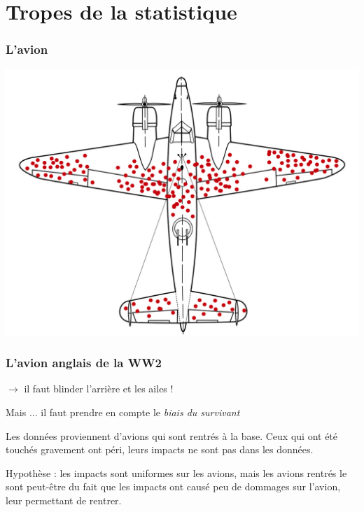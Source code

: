 \documentclass{beamer}
\begin{document}
\section{Tropes de la statistique}


\begin{frame}
\frametitle{L'avion}

\centering
\includegraphics[width=\textwidth,keepaspectratio]{img/plane.png}





\end{frame}




\begin{frame}
\frametitle{L'avion anglais de la WW2}



$\rightarrow$ il faut blinder l'arrière et les ailes ! 

Mais ... 
\pause
il faut prendre en compte le \emph{\alert{biais du survivant} }

\pause

Les données proviennent d'avions qui sont \alert{rentrés} à la base.  
Ceux qui ont été touchés gravement ont péri, leurs impacts ne sont \alert{pas} dans les données.

Hypothèse :  les impacts sont uniformes sur les avions, \alert{mais} les avions rentrés le sont peut-être du fait que les impacts ont causé peu de dommages sur l'avion, leur permettant de rentrer.

\end{frame}
\end{document}
